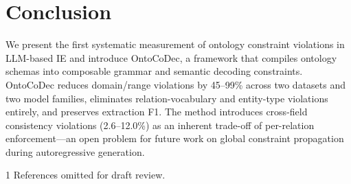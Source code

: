 \documentclass[11pt,a4paper]{article}
\newcommand{\method}{OntoCoDec}
\begin{document}
\section{Conclusion}
\label{sec:conclusion}

We present the first systematic measurement of ontology constraint violations in LLM-based IE and introduce \method{}, a framework that compiles ontology schemas into composable grammar and semantic decoding constraints. \method{} reduces domain/range violations by 45--99\% across two datasets and two model families, eliminates relation-vocabulary and entity-type violations entirely, and preserves extraction F1. The method introduces cross-field consistency violations (2.6--12.0\%) as an inherent trade-off of per-relation enforcement---an open problem for future work on global constraint propagation during autoregressive generation.


\begin{thebibliography}{1}
References omitted for draft review.
\end{thebibliography}
\end{document}
